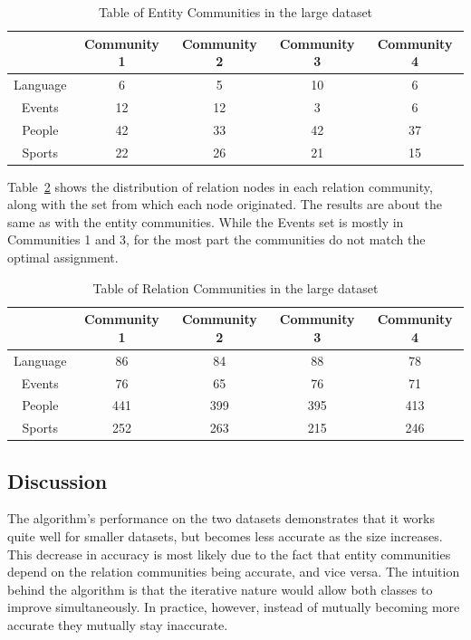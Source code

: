 \documentclass[12pt]{article}
\begin{document}
\begin{table}[]
    \begin{tabular}{|c||c|c|c|c|}
        \hline
        & Community 1 & Community 2 & Community 3 & Community 4 \\ \hline
        Language & 6 & 5 & 10 & 6 \\ \hline
        Events & 12 & 12 & 3 & 6 \\ \hline
        People & 42 & 33 & 42 & 37 \\ \hline
        Sports & 22 & 26 & 21 & 15 \\ \hline
    \end{tabular}
    \label{tab: totalE}
    \caption{Table of Entity Communities in the large dataset}
\end{table}

Table~\ref{tab: totalR} shows the distribution of relation nodes in each
relation community, along with the set from which each node originated. The
results are about the same as with the entity communities. While the Events set
is mostly in Communities 1 and 3, for the most part the communities do not
match the optimal assignment.

\begin{table}[]
    \begin{tabular}{|c||c|c|c|c|}
        \hline
        & Community 1 & Community 2 & Community 3 & Community 4 \\ \hline
        Language & 86 & 84 & 88 & 78 \\ \hline
        Events & 76 & 65 & 76  & 71 \\ \hline
        People & 441 & 399 & 395 & 413 \\ \hline
        Sports & 252 & 263 & 215 & 246 \\ \hline
    \end{tabular}
    \label{tab: totalR}
    \caption{Table of Relation Communities in the large dataset}
\end{table}

\subsection{Discussion}
\label{Discussion}

The algorithm's performance on the two datasets demonstrates that it works quite
well for smaller datasets, but becomes less accurate as the size increases. This
decrease in accuracy is most likely due to the fact that entity communities depend
on the relation communities being accurate, and vice versa. The intuition behind
the algorithm is that the iterative nature would allow both classes to improve
simultaneously. In practice, however, instead of mutually becoming more accurate
they mutually stay inaccurate.
\end{document}
